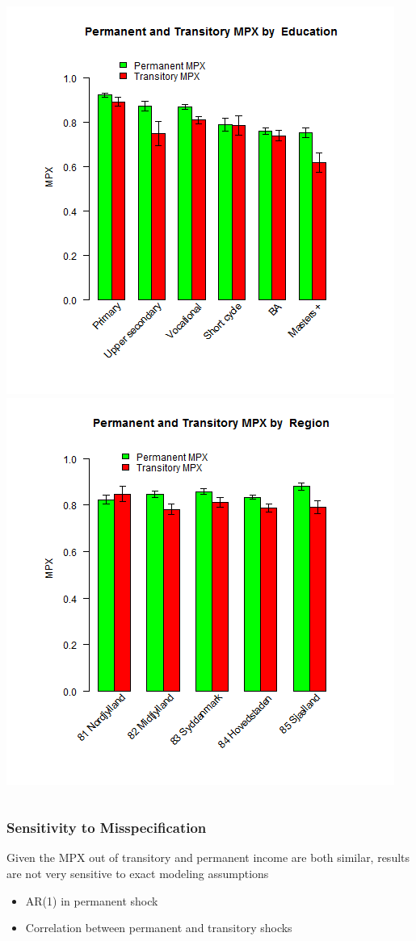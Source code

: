 \documentclass{beamer}
\begin{document}
{\begin{columns}
		\centering
		\includegraphics[scale=0.2]{../Figures/MPXByEducation.png}\\
		\includegraphics[scale=0.2]{../Figures/MPXByRegion.png}
	\end{columns} 
}
\frame
{
	\frametitle{Sensitivity to Misspecification}
	Given the MPX out of transitory and permanent income are both similar, results are not very sensitive to exact modeling assumptions
	\begin{itemize}
		\item AR(1) in permanent shock
		\item Correlation between permanent and transitory shocks
	\end{itemize}
}
\end{document}
